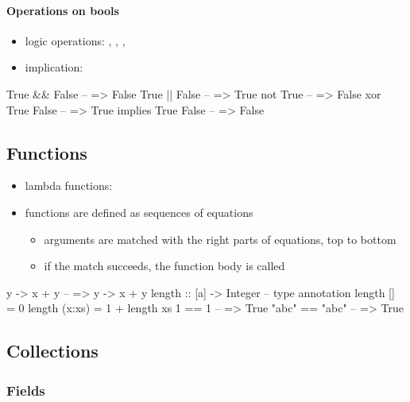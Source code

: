 \documentclass[a4paper,landscape,10pt]{article}
\begin{document}
\begin{multicols*}{2}
  \breakcolumn

  \paragraph{Operations on bools}

  \begin{itemize}
    \item logic operations: \ihaskell{&&}, \ihaskell{||}, , 
    \item implication: 
  \end{itemize}

  \begin{haskell}
True && False -- => False
True || False -- => True
not True -- => False
xor True False -- => True
implies True False -- => False
\end{haskell}

  \subsection{Functions}

  \begin{itemize}
    \item lambda functions: 
    \item functions are defined as sequences of equations
          \begin{itemize}
            \item arguments are matched with the right parts of equations, top to bottom
            \item if the match succeeds, the function body is called
          \end{itemize}
  \end{itemize}

  \begin{haskell}
\x y -> x + y -- => \x y -> x + y
length :: [a] -> Integer -- type annotation
length [] = 0
length (x:xs) = 1 + length xs
1 == 1 -- => True
"abc" == "abc" -- => True
\end{haskell}

  \subsection{Collections}

  \subsubsection{Fields}


\end{multicols*}
\end{document}
